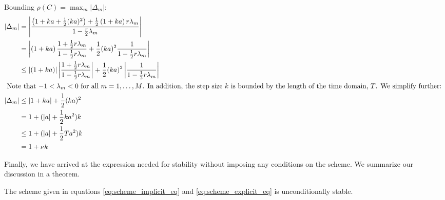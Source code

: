 Bounding \( \rho(C) = \max_{m} \lvert \Delta_m \rvert \):
\begin{align*}
  \left\lvert \Delta_m \right\rvert &= 
\left\lvert \frac{\left(1+ka+\frac{1}{2}(ka)^2\right) + \frac{1}{2}\left(1+ka\right)r \lambda_m}
{1 - \frac{r}{2} \lambda_m} \right\rvert \\
 &= 
 \left\lvert \left(1+ka\right)\frac{1+\frac{1}{2}r \lambda_m}{1 - \frac{1}{2}r \lambda_m} + \frac{1}{2}(ka)^2 \frac{1}{1 - \frac{1}{2}r \lambda_m} \right\rvert \\
 &\le \left\lvert \left(1+ka\right) \right\rvert \left\lvert \frac{1+\frac{1}{2}r \lambda_m}{1 - \frac{1}{2}r \lambda_m} \right\rvert + \frac{1}{2}(ka)^2 \left\lvert\frac{1}{1 - \frac{1}{2}r \lambda_m} \right\rvert \\
 \intertext{
   Note that \( -1 < \lambda_m < 0  \) for all \( m = 1, \dots, M \).
   In addition, the step size \( k \) is bounded by the length of
   the time domain, \( T \).
  We simplify further:
}
 \left\lvert \Delta_m \right\rvert
 &\le \left\lvert 1 + ka \right\rvert + \frac{1}{2} (ka)^2 \\
 &= 1 + (\lvert a \rvert + \frac{1}{2}k a^2 )k \\
 &\le 1 + (\lvert a \rvert + \frac{1}{2}T a^2)k \\
 &= 1 + \nu k
\end{align*}

Finally, we have arrived at the expression needed for stability
without imposing any conditions on the scheme.
We summarize our discussion in a theorem.

\begin{theorem}
    \label{stability}
  The scheme given in equations \eqref{eq:scheme_implicit_eq}
  and \eqref{eq:scheme_explicit_eq} is unconditionally stable.
\end{theorem}

